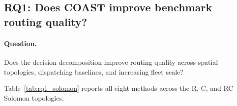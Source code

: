 \documentclass[letterpaper]{article}
\begin{document}
\subsection{RQ1: Does COAST improve benchmark routing quality?}

\paragraph{Question.} Does the decision decomposition improve routing quality across spatial topologies, dispatching baselines, and increasing fleet scale?

Table~\ref{tab:rq1_solomon} reports all eight methods across the R, C, and RC Solomon topologies.

\begin{table}[t]
\caption{Solomon-style normalized routing cost across all eight compared methods (lower is better). ``Poly.'' denotes PolyNet. COAST is the best neural method in 8 of the 9 size--topology aggregates; MARDAM is lower only on \texttt{h100}-C. COAST beats GPHH on 172/176 instances and each dispatching rule on all 176}
\centering
\resizebox{\columnwidth}{!}{
}
\end{table}
\end{document}
